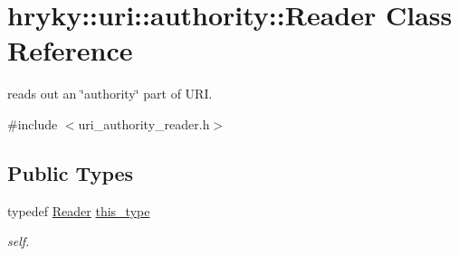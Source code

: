 \hypertarget{classhryky_1_1uri_1_1authority_1_1_reader}{\section{hryky\-:\-:uri\-:\-:authority\-:\-:Reader Class Reference}
\label{classhryky_1_1uri_1_1authority_1_1_reader}
}


reads out an \char`\"{}authority\char`\"{} part of U\-R\-I.  




{\ttfamily \#include $<$uri\-\_\-authority\-\_\-reader.\-h$>$}

\subsection*{Public Types}
\begin{DoxyCompactItemize}
\item 
\hypertarget{classhryky_1_1uri_1_1authority_1_1_reader_a8e8158d28695e0c1fa526f94bc45f66e}{typedef \hyperlink{classhryky_1_1uri_1_1authority_1_1_reader}{Reader} \hyperlink{classhryky_1_1uri_1_1authority_1_1_reader_a8e8158d28695e0c1fa526f94bc45f66e}{this\-\_\-type}}\label{classhryky_1_1uri_1_1authority_1_1_reader_a8e8158d28695e0c1fa526f94bc45f66e}

\begin{DoxyCompactList}\small\item\em self. \end{DoxyCompactList}\end{DoxyCompactItemize}
